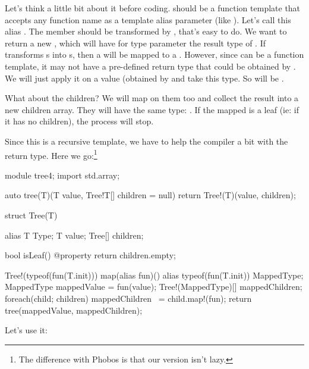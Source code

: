 Let's think a little bit about it before coding.  should be a function template that accepts any function name as a template alias parameter (like ). Let's call this alias . The  member should be transformed by , that's easy to do. We want to return a new , which will have for type parameter the result type of . If  transforms s into s, then a  will be mapped to a . However, since  can be a function template, it may not have a pre-defined return type that could be obtained by . We will just apply it on a  value (obtained by  and take this type. So  will be .

What about the children? We will map  on them too and collect the result into a new children array. They will have the same type: . If the mapped  is a leaf (ie: if it has no children), the process will stop.

Since this is a recursive template, we have to help the compiler a bit with the return type. Here we go:\footnote{ The difference with Phobos  is that our version isn't lazy.}

\begin{dcode}
module tree4;
import std.array;

auto tree(T)(T value, Tree!T[] children = null) 
{
    return Tree!(T)(value, children);
}

struct Tree(T)
{
    alias T Type;
    T value;
    Tree[] children;

    bool isLeaf() @property { return children.empty;}

    Tree!(typeof(fun(T.init))) map(alias fun)()
    {
        alias typeof(fun(T.init)) MappedType;
        MappedType mappedValue = fun(value);
        Tree!(MappedType)[] mappedChildren;
        foreach(child; children) mappedChildren ~= child.map!(fun);
        return tree(mappedValue, mappedChildren);
    }
}
\end{dcode}

Let's use it:

